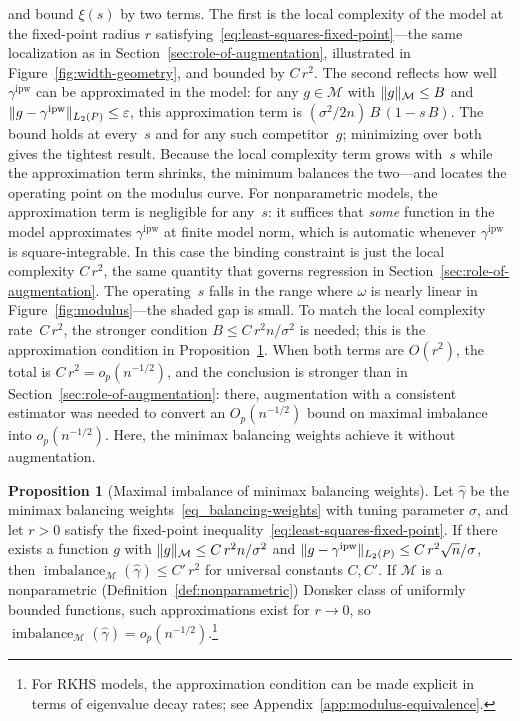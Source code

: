\documentclass{article}
\DeclarePairedDelimiter\norm{\lVert}{\rVert}
\theoremstyle{definition}
\newtheorem{proposition}[theorem]{Proposition}
\newcommand{\ipw}{\text{ipw}}
\DeclareMathOperator{\imbalance}{imbalance}
\newcommand{\hgamma}{\ensuremath{\hat\gamma}}
\newcommand{\gammaipw}{\ensuremath{\gamma^{\ipw}}}
\newcommand{\model}{\mathcal{M}}
\newcommand{\<}{\langle}
\renewcommand{\>}{\rangle}
\begin{document}
\citet{kong2025asymptotics} and \citet{hirshberg2026bregman} bound $\xi(s)$ by two terms. The first is the local complexity of the model at the fixed-point radius $r$ satisfying~\eqref{eq:least-squares-fixed-point}---the same localization as in Section~\ref{sec:role-of-augmentation}, illustrated in Figure~\ref{fig:width-geometry}, and bounded by $C\,r^2$. The second reflects how well $\gammaipw$ can be approximated in the model: for any $g \in \model$ with $\norm{g}_\model \le B$ and $\norm{g - \gammaipw}_{L_2(P)} \le \varepsilon$, this approximation term is $(\sigma^2/2n)\,B\,(1 - s\,B)$. The bound holds at every~$s$ and for any such competitor~$g$; minimizing over both gives the tightest result. Because the local complexity term grows with~$s$ while the approximation term shrinks, the minimum balances the two---and locates the operating point on the modulus curve. For nonparametric models, the approximation term is negligible for any~$s$: it suffices that \emph{some} function in the model approximates $\gammaipw$ at finite model norm, which is automatic whenever $\gammaipw$ is square-integrable. In this case the binding constraint is just the local complexity $C\,r^2$, the same quantity that governs regression in Section~\ref{sec:role-of-augmentation}. The operating~$s$ falls in the range where $\omega$ is nearly linear in Figure~\ref{fig:modulus}---the shaded gap is small. To match the local complexity rate~$C\,r^2$, the stronger condition $B \le C\,r^2 n/\sigma^2$ is needed; this is the approximation condition in Proposition~\ref{prop:bias-balance}. When both terms are $O(r^2)$, the total is $C\,r^2 = o_p(n^{-1/2})$, and the conclusion is stronger than in Section~\ref{sec:role-of-augmentation}: there, augmentation with a consistent estimator was needed to convert an $O_p(n^{-1/2})$ bound on maximal imbalance into $o_p(n^{-1/2})$. Here, the minimax balancing weights achieve it without augmentation.

\begin{proposition}[Maximal imbalance of minimax balancing weights]
\label{prop:bias-balance}
Let $\hgamma$ be the minimax balancing weights~\eqref{eq_balancing-weights} with tuning parameter $\sigma$,
and let $r > 0$ satisfy the fixed-point inequality~\eqref{eq:least-squares-fixed-point}. If there exists a function $g$ with $\norm{g}_\model \le C\, r^2 n / \sigma^2$ and $\norm{g - \gammaipw}_{L_2(P)} \le C\, r^2 \sqrt{n}/\sigma$, then $\imbalance_\model(\hgamma) \le C'\, r^2$ for universal constants $C, C'$. If $\model$ is a nonparametric (Definition~\ref{def:nonparametric}) Donsker class of uniformly bounded functions, such approximations exist for $r \to 0$, so $\imbalance_\model(\hgamma) = o_p(n^{-1/2})$.\footnote{For RKHS models, the approximation condition can be made explicit in terms of eigenvalue decay rates; see Appendix~\ref{app:modulus-equivalence}.}
\end{proposition}
\end{document}
